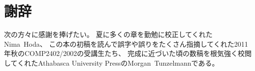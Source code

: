 \chapter*{謝辞}

次の方々に感謝を捧げたい。
夏に多くの章を勤勉に校正してくれたNima~Hoda、
この本の初稿を読んで誤字や誤りをたくさん指摘してくれた2011年秋のCOMP2402/2002の受講生たち、
完成に近づいた頃の数稿を根気強く校閲してくれたAthabasca University PressのMorgan~Tunzelmannである。
